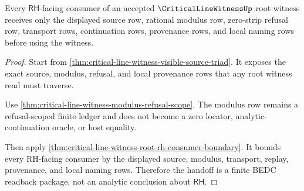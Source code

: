 \begin{theorem}
\label{thm:critical-line-witness-rh-consumer-handoff}
Every $\mathsf{RH}$-facing consumer of an accepted $\CriticalLineWitnessUp$ root witness receives only the displayed source row, rational modulus row, zero-strip refusal row, transport rows, continuation rows, provenance rows, and local naming rows before using the witness.
\end{theorem}
\begin{proof}
Start from \autoref{thm:critical-line-witness-visible-source-triad}. It exposes the exact source, modulus, refusal, and local provenance rows that any root witness read must traverse.

Use \autoref{thm:critical-line-witness-modulus-refusal-scope}. The modulus row remains a refusal-scoped finite ledger and does not become a zero locator, analytic-continuation oracle, or host equality.

Then apply \autoref{thm:critical-line-witness-root-rh-consumer-boundary}. It bounds every RH-facing consumer by the displayed source, modulus, transport, replay, provenance, and local naming rows. Therefore the handoff is a finite BEDC readback package, not an analytic conclusion about $\mathsf{RH}$.
\end{proof}
